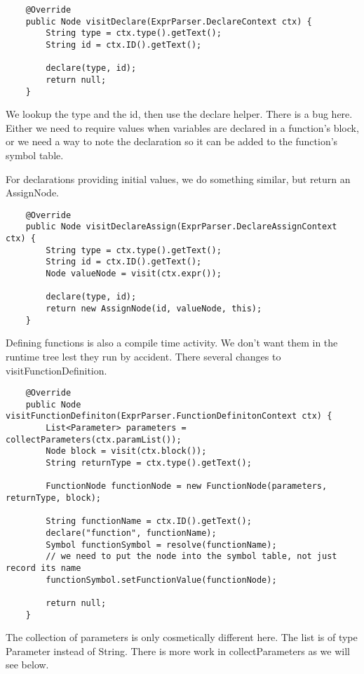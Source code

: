 {\footnotesize
\begin{verbatim}
    @Override
    public Node visitDeclare(ExprParser.DeclareContext ctx) {
        String type = ctx.type().getText();
        String id = ctx.ID().getText();

        declare(type, id);
        return null;
    }
\end{verbatim}
}

We lookup the type and the id, then use the declare helper. There
is a bug here. Either we need to require values when variables
are declared in a function's block, or we need a way to note the
declaration so it can be added to the function's symbol table.

For declarations providing initial values, we do something similar,
but return an AssignNode.

{\footnotesize
\begin{verbatim}
    @Override
    public Node visitDeclareAssign(ExprParser.DeclareAssignContext ctx) {
        String type = ctx.type().getText();
        String id = ctx.ID().getText();
        Node valueNode = visit(ctx.expr());

        declare(type, id);
        return new AssignNode(id, valueNode, this);
    }
\end{verbatim}
}

Defining functions is also a compile time activity. We don't want them
in the runtime tree lest they run by accident. There several changes
to visitFunctionDefinition.

{\footnotesize
\begin{verbatim}
    @Override
    public Node visitFunctionDefiniton(ExprParser.FunctionDefinitonContext ctx) {
        List<Parameter> parameters = collectParameters(ctx.paramList());
        Node block = visit(ctx.block());
        String returnType = ctx.type().getText();

        FunctionNode functionNode = new FunctionNode(parameters, returnType, block);

        String functionName = ctx.ID().getText();
        declare("function", functionName);
        Symbol functionSymbol = resolve(functionName);
        // we need to put the node into the symbol table, not just record its name
        functionSymbol.setFunctionValue(functionNode);

        return null;
    }
\end{verbatim}
}

The collection of parameters is only cosmetically different here. The list is of
type Parameter instead of String. There is more work in collectParameters as we
will see below.

